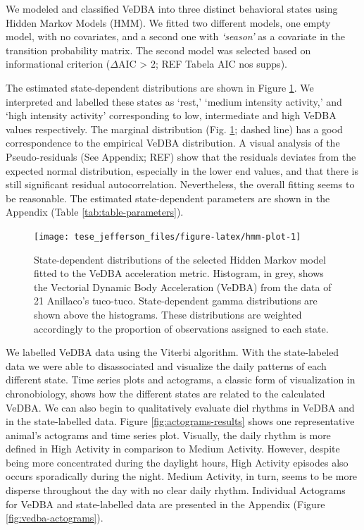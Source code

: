 \documentclass[english,msc,numbers,hidelinks]{coppe}
\begin{document}
  We modeled and classified VeDBA into three distinct behavioral states using Hidden Markov Models (HMM). We fitted two different models, one empty model, with no covariates, and a second one with \emph{`season'} as a covariate in the transition probability matrix. The second model was selected based on informational criterion (\(\Delta\)AIC \textgreater{} 2; REF Tabela AIC nos supps).

  The estimated state-dependent distributions are shown in Figure \ref{fig:hmm-plot}. We interpreted and labelled these states as `rest,' `medium intensity activity,' and `high intensity activity' corresponding to low, intermediate and high VeDBA values respectively. The marginal distribution (Fig. \ref{fig:hmm-plot}; dashed line) has a good correspondence to the empirical VeDBA distribution. A visual analysis of the Pseudo-residuals (See Appendix; REF) show that the residuals deviates from the expected normal distribution, especially in the lower end values, and that there is still significant residual autocorrelation. Nevertheless, the overall fitting seems to be reasonable. The estimated state-dependent parameters are shown in the Appendix (Table \ref{tab:table-parameters}).
  \begin{figure}

  {\centering \texttt{[image: tese\_jefferson\_files/figure-latex/hmm-plot-1]} 

  }

  \caption{State-dependent distributions of the selected Hidden Markov model fitted to the VeDBA acceleration metric. Histogram, in grey, shows the Vectorial Dynamic Body Acceleration (VeDBA) from the data of 21 Anillaco's tuco-tuco. State-dependent gamma distributions are shown above the histograms. These distributions are weighted accordingly to the proportion of observations assigned to each state.}\label{fig:hmm-plot}
  \end{figure}
  We labelled VeDBA data using the Viterbi algorithm. With the state-labeled data we were able to disassociated and visualize the daily patterns of each different state. Time series plots and actograms, a classic form of visualization in chronobiology, shows how the different states are related to the calculated VeDBA. We can also begin to qualitatively evaluate diel rhythms in VeDBA and in the state-labelled data. Figure \ref{fig:actograms-results} shows one representative animal's actograms and time series plot. Visually, the daily rhythm is more defined in High Activity in comparison to Medium Activity. However, despite being more concentrated during the daylight hours, High Activity episodes also occurs sporadically during the night. Medium Activity, in turn, seems to be more disperse throughout the day with no clear daily rhythm. Individual Actograms for VeDBA and state-labelled data are presented in the Appendix (Figure \ref{fig:vedba-actograms}).
\end{document}
